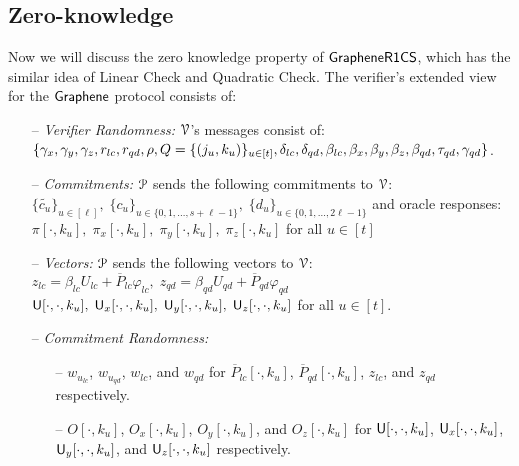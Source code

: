 \subsection{Zero-knowledge}\label{app:graphene_zk}
\noindent Now we will discuss the zero knowledge property of $\mathsf{GrapheneR1CS}$, which has the similar idea of Linear Check and Quadratic Check.
The verifier's extended view for the $\textsf{Graphene}$ protocol consists of:
\begin{itemize}
	\item[--] {\em Verifier Randomness:} $\mathcal{V}$'s messages consist of:	$\{\gamma_x, \gamma_y, \gamma_z, r_{lc}, r_{qd}, \rho, Q=\{(j_u,k_u)\}_{u\in[t]},\\ \delta_{lc}, \delta_{qd}, \beta_{lc}, \beta_x, \beta_y, \beta_z, \beta_{qd}, \tau_{qd}, \gamma_{qd}\}$.
	\item[--] {\em Commitments:} $\mathcal{P}$ sends the following commitments to $\mathcal{V}$:
	$\{\tilde{c_u}\}_{u\in[\ell]}, \; \{c_u\}_{u\in\{0, 1, \ldots, s+\ell-1 \} }, \; \{d_u\}_{u\in \{0, 1, \ldots, 2\ell-1\}}$
	and oracle responses:
	$ \pi[\cdot,k_u],\; \pi_x[\cdot,k_u],\; \pi_y[\cdot, k_u],\; \pi_z[\cdot,k_u] $
	for all $u\in[t]$
	\item[--] {\em Vectors: } $\mathcal{P}$ sends the following vectors to $\mathcal{V}$:
	$z_{lc}=\beta_{lc} U_{lc}+\overline{P}_{lc}\varphi_{lc}, \; z_{qd}=\beta_{qd} U_{qd}+\overline{P}_{qd}\varphi_{qd}$\\
	$\mathsf{U}[\cdot,\cdot,k_u],\; \mathsf{U}_x[\cdot,\cdot,k_u],\; \mathsf{U}_y[\cdot, \cdot,k_u],\; \mathsf{U}_z[\cdot,\cdot,k_u]$ for all $u\in[t]$.
	\item[--] {\em Commitment Randomness: }
	\begin{itemize}
		\item[--] $w_{u_{lc}}$, $w_{u_{qd}}$, $w_{lc}$, and $w_{qd}$ for $\overline{P}_{lc}[\cdot,k_u]$, $\overline{P}_{qd}[\cdot,k_u]$, $z_{lc}$, and $z_{qd}$ respectively. 
		\item[--] $O[\cdot, k_u]$, $O_x[\cdot, k_u]$, $O_y[\cdot, k_u]$, and $O_z[\cdot, k_u]$ for $\mathsf{U}[\cdot,\cdot,k_u]$, $\mathsf{U}_x[\cdot,\cdot,k_u]$, $\mathsf{U}_y[\cdot,\cdot,k_u]$, and $\mathsf{U}_z[\cdot,\cdot,k_u]$ respectively.
	\end{itemize}
\end{itemize}

